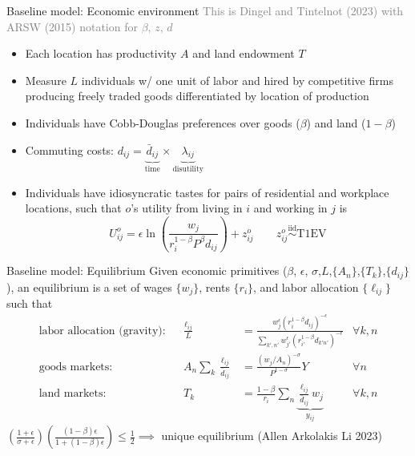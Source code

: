 \documentclass[11pt,notes=hide,aspectratio=169]{beamer}
\begin{document}
\begin{frame}{Baseline model: Economic environment}
\textcolor{gray}{This is Dingel and Tintelnot (2023) with ARSW (2015) notation for $\beta$, $z$, $d$}
\begin{itemize}
\item
Each location has productivity $A$ and land endowment $T$
\item 
Measure $L$ individuals w/ one unit of labor
and hired by 
competitive firms producing freely traded goods differentiated by location of production
\item
Individuals have Cobb-Douglas preferences over goods ($\beta$) and land ($1-\beta$) 
\item
Commuting costs: $d_{ij} = \underbrace{\bar{d}_{ij}}_{\text{time}} \times \underbrace{\lambda_{ij}}_{\text{disutility}}$
\item
Individuals have idiosyncratic tastes for pairs of residential and workplace locations,
such that
$o$'s utility from living in $i$ and working in $j$ is
\begin{equation*}
U_{ij}^{o} = \epsilon \ln\left(\frac{w_j}{r_i^{1-\beta} P^\beta d_{ij}}\right) + z_{ij}^{o}
\qquad
z_{ij}^{o} \stackrel{\text{iid}}{\sim} \text{T1EV}
\end{equation*}
\end{itemize}
\end{frame}
\begin{frame}{Baseline model: Equilibrium}
Given economic primitives ($\beta$, $\epsilon$, $\sigma$,$L$,$\{A_n\}$,$\{T_k\}$,$\{d_{ij}\}$),
an equilibrium is a set of wages $\{w_j\}$, rents $\{r_i\}$, and labor allocation $\{\ell_{ij}\}$
such that
\begin{align}
\text{labor allocation (gravity):}&&
\frac{\ell_{ij}}{L}
&=
\frac
{w_{j}^\epsilon \left(r_{i}^{1-\beta} d_{ij}\right)^{-\epsilon}}
{\sum_{k',n'}w_{j'}^\epsilon \left(r_{i'}^{1-\beta}  d_{k'n'}\right)^{-\epsilon}}
\label{eqn:cont_laborallocation}
&\forall k,n
\\
\text{goods markets:}&&
A_n \sum_k \frac{\ell_{ij}}{\bar{d}_{ij}} 
&=
\frac{\left({w_j}/{A_n}\right)^{-\sigma}}{P^{1-\sigma}} Y %
&\forall n
\label{eqn:tradeeqlbm:goodsmarketclearing}
\\
\text{land markets:}&&
T_k
&=
\frac{1-\beta}{r_i} \sum_n \underbrace{\frac{\ell_{ij}}{\bar{d}_{ij}} w_j}_{y_{ij}}
&\forall k,n
\label{eqn:tradeeqlbm:landsmarketclearing} 
\end{align}
$\left(\frac{1+\epsilon}{\sigma + \epsilon}\right) \left(\frac{(1-\beta) \epsilon}{1+(1-\beta) \epsilon}\right) \leq \frac{1}{2} \implies$ unique equilibrium (Allen Arkolakis Li 2023)
\end{frame}
\end{document}
